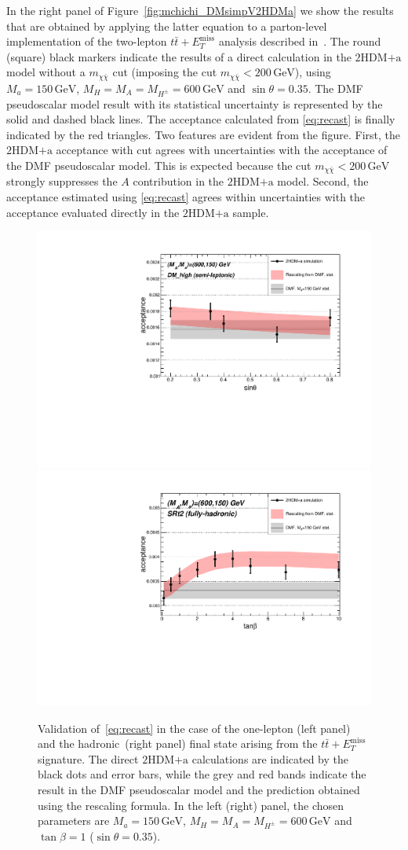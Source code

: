 \documentclass[review]{elsarticle}
\newcommand{\MET}{\ensuremath{E_T^\mathrm{miss}}\xspace}
\newcommand{\mA}{\ensuremath{M_{A}}\xspace}
\newcommand{\ma}{\ensuremath{M_{a}}\xspace}
\newcommand{\mH}{\ensuremath{M_{H}}\xspace}
\newcommand{\mHc}{\ensuremath{M_{H^{\pm}}}\xspace}
\newcommand{\hdma}{\ensuremath{\textrm{2HDM+a}}\xspace}
\begin{document}
In the right panel of Figure~\ref{fig:mchichi_DMsimpV2HDMa} we show the results that are obtained by applying the latter equation to a parton-level implementation of the two-lepton $t \bar t + \MET$ analysis described in~\cite{Aaboud:2017rzf}. The round (square) black markers indicate the results of a direct calculation in the \hdma model without a $m_{\chi \bar \chi}$ cut (imposing the cut $m_{\chi \bar \chi} < 200 \, {\mathrm{GeV}}$), using $\ma = 150 \, {\mathrm{GeV}}$, $\mH= \mA = \mHc =600 \, {\mathrm{GeV}}$ and $\sin\theta=0.35$. The DMF pseudoscalar model result with its statistical uncertainty is represented by the solid and dashed black lines. The acceptance calculated from \eqref{eq:recast} is finally indicated by the red triangles. Two features are evident from the figure. First, the \hdma acceptance with cut agrees with uncertainties with the acceptance of the DMF pseudoscalar model. This is expected because the cut $m_{\chi \bar \chi} < 200 \, {\mathrm{GeV}}$ strongly suppresses the $A$ contribution in the \hdma model. Second, the acceptance estimated using  \eqref{eq:recast} agrees within uncertainties with the acceptance evaluated directly in the \hdma sample. 

\begin{figure}[t!]
\includegraphics[width=.5\textwidth]{DM_high_600_150_sin.pdf}
\includegraphics[width=.5\textwidth]{SRt2_600_150_tan.pdf}
\vspace{2mm}
\caption{Validation of~\eqref{eq:recast} in the case of the one-lepton (left panel) and the hadronic~(right panel)  final state arising from the $t \bar t+\MET$ signature. The direct \hdma calculations are indicated by the black dots and error bars, while the grey and red bands indicate the result in the DMF pseudoscalar model and the prediction obtained using the rescaling formula.  In the left (right) panel, the  chosen parameters are $\ma = 150 \, {\mathrm{GeV}}$, $\mH= \mA = \mHc = 600 \, {\mathrm{GeV}}$ and $\tan \beta = 1$ ($\sin\theta=0.35$).}
\label{DMHF:pof}
\end{figure}
\end{document}
